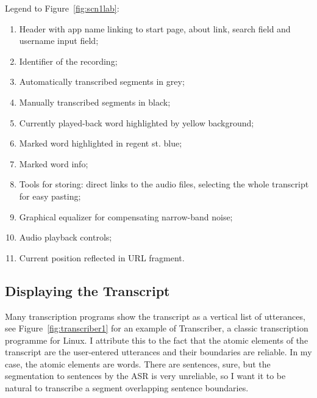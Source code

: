 \documentclass[12pt,a4paper]{report}
\begin{document}
Legend to Figure~\ref{fig:scn1lab}:
\begin{enumerate}
\item{
    Header with
    {app name linking to start page,}
    {about link,}
    {search field and}
    {username input field;}
}
\item{Identifier of the recording;}
\item{Automatically transcribed segments in grey;}
\item{Manually transcribed segments in black;}
\item{Currently played-back word highlighted by yellow background;}
\item{Marked word highlighted in regent st. blue;}
\item{Marked word info;}
\item{
    Tools for storing:
    {direct links to the audio files,}
    {selecting the whole transcript for easy pasting;}
}
\item{Graphical equalizer for compensating narrow-band noise;}
\item{Audio playback controls;}
\item{Current position reflected in URL fragment.}
\end{enumerate}

\subsection{Displaying the Transcript}

Many transcription programs show the transcript as a vertical list of
utterances, see Figure~\ref{fig:transcriber1} for an example of
Transcriber, a classic transcription programme for Linux. I attribute this to the fact that the atomic elements of
the transcript are the user-entered utterances and their boundaries are
reliable. In my case, the atomic elements are words. There are sentences, sure,
but the segmentation to sentences by the ASR is very unreliable, so I want it
to be natural to transcribe a segment overlapping sentence boundaries.
\end{document}
